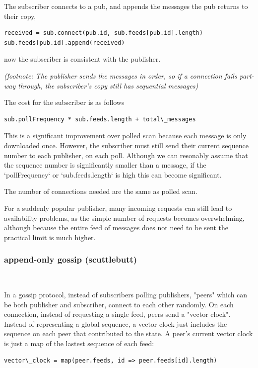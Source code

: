 \documentclass[sigconf]{acmart}
\begin{document}
The subscriber connects to a pub, and appends the messages the pub
returns to their copy,

\begin{verbatim}
received = sub.connect(pub.id, sub.feeds[pub.id].length)
sub.feeds[pub.id].append(received)
\end{verbatim}
now the subscriber is consistent with the publisher.

{\em (footnote: The publisher sends the messages in order, so if a
  connection fails part-way through, the subscriber's copy still has
  sequential messages)}

The cost for the subscriber is as follows

\begin{verbatim}
sub.pollFrequency * sub.feeds.length + total\_messages
\end{verbatim}

This is a significant improvement over polled scan because each
message is only downloaded once.  However, the subscriber must still
send their current sequence number to each publisher, on each poll.
Although we can resonably assume that the sequence number is
significantly smaller than a message, if the `pollFrequency` or
`sub.feeds.length` is high this can become significant.

The number of connections needed are the same as polled scan.

For a suddenly popular publisher, many incoming requests can still
lead to availability problems, as the simple number of requests
becomes overwhelming, although because the entire feed of messages
does not need to be sent the practical limit is much higher.

\subsubsection{append-only gossip (scuttlebutt)}\ \\ \vspace{-1em}

In a gossip protocol, instead of subscribers polling publishers,
"peers" which can be both publisher and subscriber, connect to each
other randomly.  On each connection, instead of requesting a single
feed, peers send a "vector clock".  Instead of representing a global
sequence, a vector clock just includes the sequence on each peer that
contributed to the state. A peer's current vector clock is just a map
of the lastest sequence of each feed:

\begin{verbatim}
vector\_clock = map(peer.feeds, id => peer.feeds[id].length)
\end{verbatim}
\end{document}
